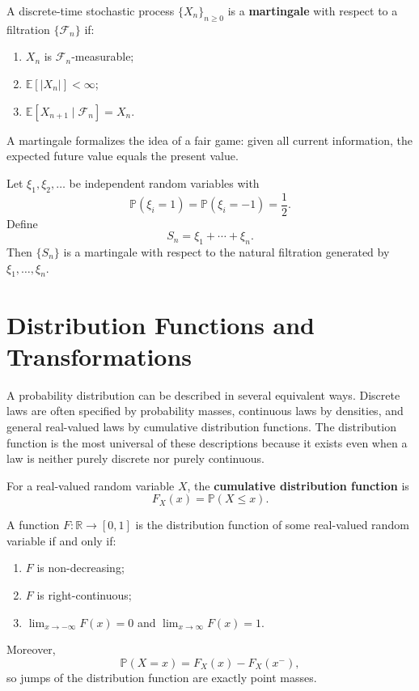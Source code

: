 \begin{definition}[Martingale]
A discrete-time stochastic process $\{X_n\}_{n\geq 0}$ is a \textbf{martingale} with respect to a filtration $\{\mathcal{F}_n\}$ if:
\begin{enumerate}
    \item $X_n$ is $\mathcal{F}_n$-measurable;
    \item $\mathbb{E}[|X_n|]<\infty$;
    \item $\mathbb{E}[X_{n+1}\mid\mathcal{F}_n]=X_n$.
\end{enumerate}
\end{definition}

\begin{remark}
A martingale formalizes the idea of a fair game: given all current information, the expected future value equals the present value.
\end{remark}

\begin{example}
Let $\xi_1,\xi_2,\dots$ be independent random variables with
\[
    \mathbb{P}(\xi_i=1)=\mathbb{P}(\xi_i=-1)=\frac12.
\]
Define
\[
    S_n=\xi_1+\cdots+\xi_n.
\]
Then $\{S_n\}$ is a martingale with respect to the natural filtration generated by $\xi_1,\dots,\xi_n$.
\end{example}


\section{Distribution Functions and Transformations}

A probability distribution can be described in several equivalent ways. Discrete laws are often specified by probability masses, continuous laws by densities, and general real-valued laws by cumulative distribution functions. The distribution function is the most universal of these descriptions because it exists even when a law is neither purely discrete nor purely continuous.

\begin{definition}
For a real-valued random variable $X$, the \textbf{cumulative distribution function} is
\[
    F_X(x)=\mathbb{P}(X\leq x).
\]
\end{definition}

\begin{theorem}
A function $F:\mathbb{R}\to[0,1]$ is the distribution function of some real-valued random variable if and only if:
\begin{enumerate}
    \item $F$ is non-decreasing;
    \item $F$ is right-continuous;
    \item $\lim_{x\to-\infty}F(x)=0$ and $\lim_{x\to\infty}F(x)=1$.
\end{enumerate}
Moreover,
\[
    \mathbb{P}(X=x)=F_X(x)-F_X(x^-),
\]
so jumps of the distribution function are exactly point masses.
\end{theorem}

